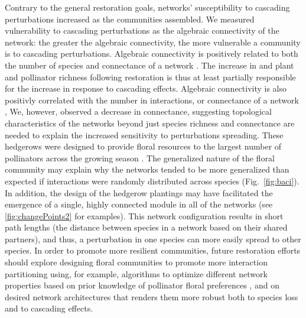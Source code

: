 \documentclass[12pt]{article}
\begin{document}
Contrary to the general restoration goals, networks' susceptibility to
cascading perturbations increased as the communities assembled. We
measured vulnerability to cascading perturbations as the algebraic
connectivity of the network: the greater the algebraic connectivity,
the more vulnerable a community is to cascading
perturbations. Algebraic connectivity is positively related to both
the number of species and connectance of a network
\citep{gibert2013spatial}. The increase in and plant and pollinator
richness following restoration is thus at least partially responsible
for the increase in response to cascading effects.  Algebraic
connectivity is also positivly correlated with the number in
interactions, or connectance of a network \citep{gibert2013spatial},
We, however, observed a decrease in connectance, suggesting
topological characteristics of the networks beyond just species
richness and connectance are needed to explain the increased
sensitivity to perturbations spreading. These hedgerows were designed
to provide floral resources to the largest number of pollinators
across the growing season \citep{menz-2010-4}. The generalized nature
of the floral community may explain why the networks tended to be more
generalized than expected if interactions were randomly distributed
across species (Fig.~\ref{fig:baci}). In addition, the design of the
hedgerow plantings may have facilitated the emergence of a single,
highly connected module in all of the networks (see
\ref{fig:changePoints2} for examples). This network configuration
results in short path lengths (the distance between species in a
network based on their shared partners), and thus, a perturbation in
one species can more easily spread to other species. In order to
promote more resilient communities, future restoration efforts should
explore designing floral communities to promote more interaction
partitioning using, for example, algorithms to optimize different
network properties based on prior knowledge of pollinator floral
preferences \citep{mgonigle2016tool}, and on desired network
architectures that renders them more robust both to species loss and
to cascading effects.


\end{document}
